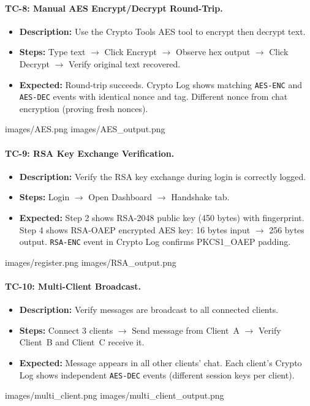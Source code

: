 \documentclass[12pt,a4paper]{article}
\begin{document}
\paragraph{TC-8: Manual AES Encrypt/Decrypt Round-Trip.}
\begin{itemize}
    \item \textbf{Description:} Use the Crypto Tools AES tool to encrypt then decrypt text.
    \item \textbf{Steps:} Type text $\to$ Click Encrypt $\to$ Observe hex output $\to$ Click Decrypt $\to$ Verify original text recovered.
    \item \textbf{Expected:} Round-trip succeeds. Crypto Log shows matching \texttt{AES-ENC} and \texttt{AES-DEC} events with identical nonce and tag. Different nonce from chat encryption (proving fresh nonces).
\end{itemize}
    {images/AES.png}%
    {images/AES_output.png}%

\paragraph{TC-9: RSA Key Exchange Verification.}
\begin{itemize}
    \item \textbf{Description:} Verify the RSA key exchange during login is correctly logged.
    \item \textbf{Steps:} Login $\to$ Open Dashboard $\to$ Handshake tab.
    \item \textbf{Expected:} Step 2 shows RSA-2048 public key (450 bytes) with fingerprint. Step 4 shows RSA-OAEP encrypted AES key: 16 bytes input $\to$ 256 bytes output. \texttt{RSA-ENC} event in Crypto Log confirms PKCS1\_OAEP padding.
\end{itemize}
    {images/register.png}%
    {images/RSA_output.png}%

\paragraph{TC-10: Multi-Client Broadcast.}
\begin{itemize}
    \item \textbf{Description:} Verify messages are broadcast to all connected clients.
    \item \textbf{Steps:} Connect 3 clients $\to$ Send message from Client~A $\to$ Verify Client~B and Client~C receive it.
    \item \textbf{Expected:} Message appears in all other clients' chat. Each client's Crypto Log shows independent \texttt{AES-DEC} events (different session keys per client).
\end{itemize}
    {images/multi_client.png}%
    {images/multi_client_output.png}%
\end{document}
